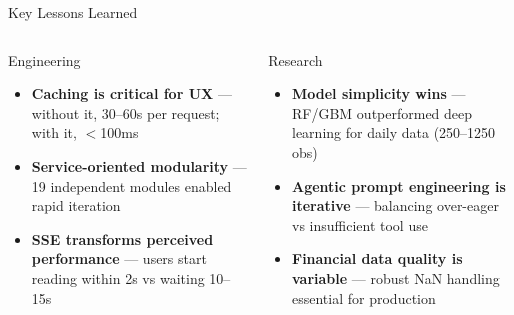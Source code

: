 \documentclass[aspectratio=169, 11pt]{beamer}
\begin{document}
\begin{frame}{Key Lessons Learned}
\begin{columns}[T]
\begin{block}{Engineering}
\small
\begin{itemize}
  \item \textbf{Caching is critical for UX} --- without it, 30--60s per request; with it, $<$100ms
  \item \textbf{Service-oriented modularity} --- 19 independent modules enabled rapid iteration
  \item \textbf{SSE transforms perceived performance} --- users start reading within 2s vs waiting 10--15s
\end{itemize}
\end{block}

\begin{block}{Research}
\small
\begin{itemize}
  \item \textbf{Model simplicity wins} --- RF/GBM outperformed deep learning for daily data (250--1250 obs)
  \item \textbf{Agentic prompt engineering is iterative} --- balancing over-eager vs insufficient tool use
  \item \textbf{Financial data quality is variable} --- robust NaN handling essential for production
\end{itemize}
\end{block}
\end{columns}
\end{frame}
\end{document}
